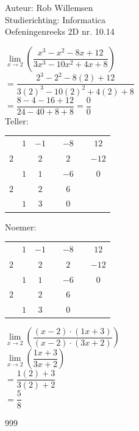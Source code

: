 \documentclass[a4paper]{article}
\begin{document}
\noindent \large Auteur: Rob Willemsen \\
\noindent \large Studierichting: Informatica\\
\noindent \large Oefeningenreeks 2D nr. 10.14\\

\medskip

\normalsize

$\lim\limits_{x \rightarrow 2} \left(\dfrac{x^3 - x^2 - 8x + 12}{3x^3 - 10x^2 + 4x + 8}\right)$ \\

$= \dfrac{2^3 - 2^2 - 8(2) + 12}{3(2)^3 - 10(2)^2 + 4(2) + 8}$ \\

$= \dfrac{8 - 4 - 16 + 12}{24 - 40 + 8 + 8} = \dfrac{0}{0}$ \\

Teller: \\

\begin{tabular}{c|cccccc}
$  $ & $1$ & $-1$ & & $-8$ & & $12 $	\\
$ 2$ & $ $ & $2 $ & & $2 $ & & $-12$    \\ \hline
$  $ & $1$ & $1 $ & & $-6$ & \vline & $0$ \\
$ 2$ & $ $ & $2 $ & & $ 6$ & & $ $    \\ \hline
$  $ & $1$ & $3 $ & \vline & $0$  & $ $
\end{tabular}

Noemer: \\

\begin{tabular}{c|cccccc}
$  $ & $1$ & $-1$ & & $-8$ & & $12 $	\\
$ 2$ & $ $ & $2 $ & & $2 $ & & $-12$    \\ \hline
$  $ & $1$ & $1 $ & & $-6$ & \vline & $0$ \\
$ 2$ & $ $ & $2 $ & & $ 6$ & & $ $    \\ \hline
$  $ & $1$ & $3 $ & \vline & $0$  & $ $ 
\end{tabular}

$\lim\limits_{x \rightarrow 2} \left(\dfrac{(x-2) \cdot (1x +3)}{(x-2) \cdot (3x +2)}\right)$ \\

$\lim\limits_{x \rightarrow 2} \left(\dfrac{1x +3}{3x +2}\right)$ \\

$= \dfrac{1(2) +3}{3(2) +2}$ \\

$= \dfrac{5}{8}$ \\

\begin{thebibliography}{999}
\end{thebibliography}
\end{document}
